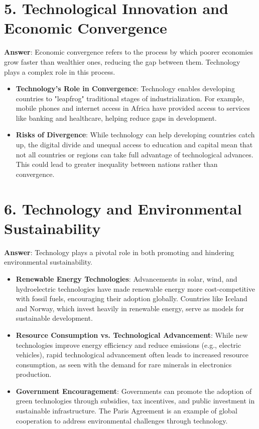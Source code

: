 \documentclass{article}
\begin{document}
\section*{5. Technological Innovation and Economic Convergence}
\textbf{Answer}:  
Economic convergence refers to the process by which poorer economies grow faster than wealthier ones, reducing the gap between them. Technology plays a complex role in this process.

\begin{itemize}
    \item \textbf{Technology’s Role in Convergence}:  
    Technology enables developing countries to "leapfrog" traditional stages of industrialization. For example, mobile phones and internet access in Africa have provided access to services like banking and healthcare, helping reduce gaps in development.
    
    \item \textbf{Risks of Divergence}:  
    While technology can help developing countries catch up, the digital divide and unequal access to education and capital mean that not all countries or regions can take full advantage of technological advances. This could lead to greater inequality between nations rather than convergence.
\end{itemize}

\newpage
\section*{6. Technology and Environmental Sustainability}
\textbf{Answer}:  
Technology plays a pivotal role in both promoting and hindering environmental sustainability.

\begin{itemize}
    \item \textbf{Renewable Energy Technologies}:  
    Advancements in solar, wind, and hydroelectric technologies have made renewable energy more cost-competitive with fossil fuels, encouraging their adoption globally. Countries like Iceland and Norway, which invest heavily in renewable energy, serve as models for sustainable development.
    
    \item \textbf{Resource Consumption vs. Technological Advancement}:  
    While new technologies improve energy efficiency and reduce emissions (e.g., electric vehicles), rapid technological advancement often leads to increased resource consumption, as seen with the demand for rare minerals in electronics production.
    
    \item \textbf{Government Encouragement}:  
    Governments can promote the adoption of green technologies through subsidies, tax incentives, and public investment in sustainable infrastructure. The Paris Agreement is an example of global cooperation to address environmental challenges through technology.
\end{itemize}
\end{document}
